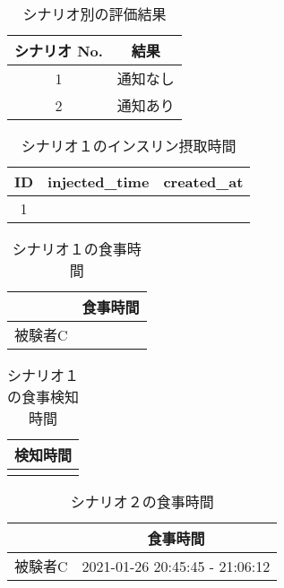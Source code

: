 \begin{table}[htbp]
  \caption{シナリオ別の評価結果}
  \label{tb:result_scenarios}
  \begin{center}
    \begin{tabular}{|c||c|}
      \hline
      シナリオ No.  & 結果 \\
      \hline\hline
      1  & 通知なし \\\hline
      2 & 通知あり \\\hline
    \end{tabular}
  \end{center}
\end{table}

\begin{table}[htbp]
  \caption{シナリオ１のインスリン摂取時間}
  \label{tb:scenario_1_insulin}
  \begin{center}
    \begin{tabular}{|c||c|c|}
      \hline
      ID  & injected\_time & created\_at \\
      \hline\hline
      1 &  &  \\\hline
    \end{tabular}
  \end{center}
\end{table}

\begin{table}[htbp]
  \caption{シナリオ１の食事時間}
  \label{tb:scenario_2_meal}
  \begin{center}
    \begin{tabular}{|c||c|}
      \hline
        & 食事時間 \\
      \hline\hline
      被験者C & \\\hline
    \end{tabular}
  \end{center}
\end{table}

\begin{table}[htbp]
  \caption{シナリオ１の食事検知時間}
  \label{tb:scenario_1_meal}
  \begin{center}
    \begin{tabular}{|c|}
      \hline
      検知時間 \\
      \hline\hline
       \\\hline
    \end{tabular}
  \end{center}
\end{table}

\begin{table}[htbp]
  \caption{シナリオ２の食事時間}
  \label{tb:scenario_2_meal}
  \begin{center}
    \begin{tabular}{|c||c|}
      \hline
        & 食事時間 \\
      \hline\hline
      被験者C & 2021-01-26 20:45:45 - 21:06:12 \\\hline
    \end{tabular}
  \end{center}
\end{table}

